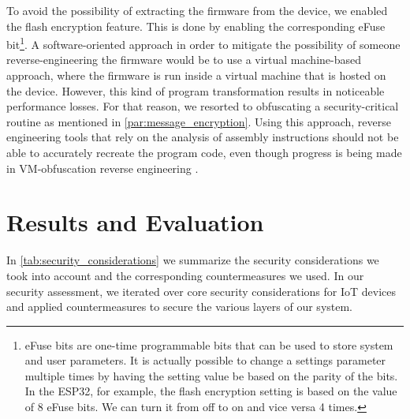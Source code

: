 \documentclass[conference]{IEEEtran}
\begin{document}
To avoid the possibility of extracting the firmware from the device,
we enabled the flash encryption feature. This is done by enabling the
corresponding eFuse bit\footnote{eFuse bits are one-time programmable bits that
can be used to store system and user parameters. 
It is actually possible to change a settings parameter multiple times by having the setting 
value be based on the parity of the  bits. In the ESP32, for example, the flash encryption setting 
is based on the value of 8 eFuse bits. We can turn it from off to on and vice versa 4 times.
}. A software-oriented approach in order to mitigate the possibility of someone reverse-engineering the firmware would be to use
a virtual machine-based approach,
where the firmware is run inside a virtual machine that is hosted on the device.
However, this kind of program transformation results in noticeable performance losses.
For that reason, we resorted to obfuscating a security-critical routine as mentioned in \cref{par:message_encryption}.
Using this approach, reverse engineering tools that rely on the analysis of
assembly instructions should not be able to accurately recreate the program
code, even though progress is being made in VM-obfuscation reverse engineering \cite{VMReversing, UnpackingVirtualizationObfuscators}.

\section{Results and Evaluation}

In \cref{tab:security_considerations} we summarize the security considerations we took into account and the corresponding countermeasures we used.
In our security assessment, we iterated over core security considerations for IoT devices\cite{ComprehensiveSecurity} and applied countermeasures 
to secure the various layers of our system.
\end{document}
